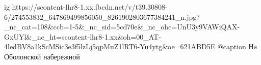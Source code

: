  
 
 
 
 

\ifcmt
  ig https://scontent-lhr8-1.xx.fbcdn.net/v/t39.30808-6/274553832_647869499856050_8261902803677384241_n.jpg?_nc_cat=108&ccb=1-5&_nc_sid=5cd70e&_nc_ohc=UnU3y9VAWiQAX-GxUYl&_nc_ht=scontent-lhr8-1.xx&oh=00_AT-4ledBV8a1kScMSic3e3f5lzLj5qpMuZ1lRT6-Yu4ytg&oe=621ABD5E
	@caption На Оболонской набережной
\fi
